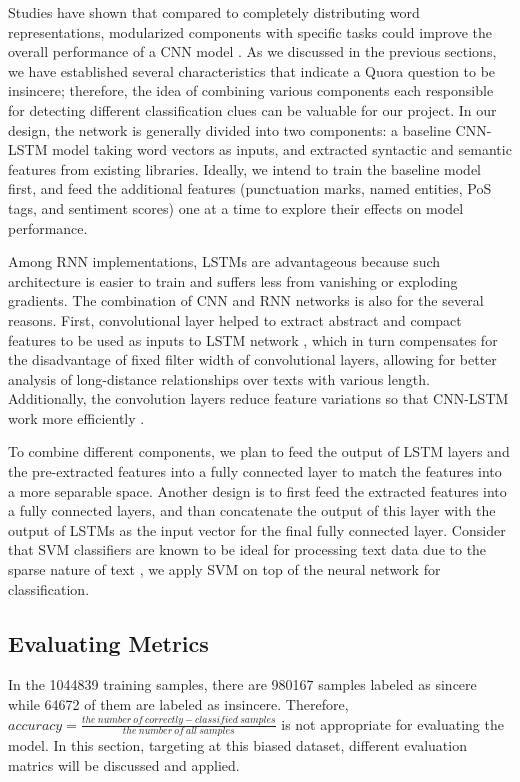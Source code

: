 \documentclass[12pt]{diazessay} %
\begin{document}
Studies have shown that compared to completely distributing word representations, modularized components with specific tasks could improve the overall performance of a CNN model \citep{poria2017}. As we discussed in the previous sections, we have established several characteristics that indicate a Quora question to be insincere; therefore, the idea of combining various components each responsible for detecting different classification clues can be valuable for our project. In our design, the network is generally divided into two components: a baseline CNN-LSTM model taking word vectors as inputs, and extracted syntactic and semantic features from existing libraries. Ideally, we intend to train the baseline model first, and feed the additional features (punctuation marks, named entities, PoS tags, and sentiment scores) one at a time to explore their effects on model performance. 

Among RNN implementations, LSTMs are advantageous because such architecture is easier to train and suffers less from vanishing or exploding gradients. The combination of CNN and RNN networks is also for the several reasons. First, convolutional layer helped to extract abstract and compact features to be used as inputs to LSTM network \citep{chan2015}, which in turn compensates for the disadvantage of fixed filter width of convolutional layers, allowing for better analysis of long-distance relationships over texts with various length. Additionally, the convolution layers reduce feature variations so that CNN-LSTM work more efficiently \citep{ghosh2016}.

To combine different components, we plan to feed the output of LSTM layers and the pre-extracted features into a fully connected layer to match the features into a more separable space. Another design is to first feed the extracted features into a fully connected layers, and than concatenate the output of this layer with the output of LSTMs as the input vector for the final fully connected layer. Consider that SVM classifiers are known to be ideal for processing text data due to the sparse nature of text \citep{medhat2014}, we apply SVM on top of the neural network for classification. 



\subsection{Evaluating Metrics}

In the \num[group-separator={,}]{1044839} training samples, there are \num[group-separator={,}]{980167} samples labeled as sincere while \num[group-separator={,}]{64672} of them are labeled as insincere. Therefore, $accuracy = \frac{ the\ number\ of\ correctly-classified\ samples}{the\ number\ of\ all\ samples}$ is not appropriate for evaluating the model. In this section, targeting at this biased dataset, different evaluation matrics will be discussed and applied.
\end{document}
